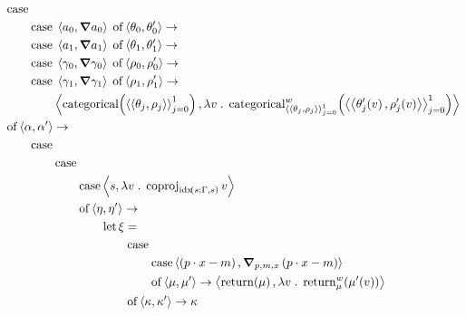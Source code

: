 \documentclass[11pt,a4paper]{article}
\theoremstyle{definition}
\theoremstyle{remark}
\begin{document}
{
  \allowdisplaybreaks
  \begin{alignat*}{2}
    &\opn[b]{case}
    \\
    &\qquad \opn[b]{case} \; \tuple{ a_{0}, \grad a_{0} } \; \opn[b]{of}
      \tuple{ \theta_{0}, \theta_{0}' } \to
    \\
    &\qquad \opn[b]{case} \; \tuple{ a_{1}, \grad a_{1} } \; \opn[b]{of}
      \tuple{ \theta_{1}, \theta_{1}' } \to
    \\
    &\qquad \opn[b]{case} \; \tuple{ \gamma_{0}, \grad \gamma_{0} } \; \opn[b]{of}
      \tuple{ \rho_{0}, \rho_{0}' } \to
    \\
    &\qquad \opn[b]{case} \; \tuple{ \gamma_{1}, \grad \gamma_{1} } \; \opn[b]{of}
      \tuple{ \rho_{1}, \rho_{1}' } \to
    \\
    &\qquad \qquad
      \tuple{
      \fn[n]{ \opn[b]{categorical} }{
      \tuple{ \tuple{ \theta_{j}, \rho_{j} } }_{j = 0}^{1}
      },
      \lambda v \; . \;
      \fn[n]{
      \opn[b]{categorical}^{w}_{
      \tuple{ \tuple{ \theta_{j}, \rho_{j} } }_{j = 0}^{1}
      }
      }{
      \tuple{ \tuple{ \fn[n]{ \theta_{j}' }{ v }, \fn[n]{ \rho_{j}' }{ v } } }_{j = 0}^{1}
      }
      }
    \\
    &\opn[b]{of} \tuple{ \alpha, \alpha' } \to
    \\
    &\qquad
      \opn[b]{case}
    \\
    &\qquad \qquad
      \opn[b]{case}
    \\
    &\qquad \qquad \qquad
      \opn[b]{case}
      \tuple{ s, \lambda v \; . \; \opn[b]{coproj}_{\fn[n]{ \opn{idx} }{ s; \Gamma, s }} v }
    \\
    &\qquad \qquad \qquad
      \opn[b]{of} \tuple{ \eta, \eta' } \to
    \\
    &\qquad \qquad \qquad \qquad
      \opn[b]{let} \xi =
    \\
    &\qquad \qquad \qquad \qquad \qquad
      \opn[b]{case}
      \\
    &\qquad \qquad \qquad \qquad \qquad \qquad
      \opn[b]{case}
      \tuple{ \left( p \cdot x - m \right), \grad_{p, m, x} \left( p \cdot x - m \right) }
      \\
    &\qquad \qquad \qquad \qquad \qquad \qquad
      \opn[b]{of} \tuple{ \mu, \mu' } \to
      \tuple{
      \fn[n]{ \opn[b]{return} }{ \mu },
      \lambda v \; . \;
      \fn[n]{ \opn[b]{return}^{w}_{\mu} }{ \fn[n]{ \mu' }{ v } }
      }
      \\
    &\qquad \qquad \qquad \qquad \qquad
      \opn[b]{of} \tuple{ \kappa, \kappa' } \to \kappa

\end{alignat*}}
\end{document}
